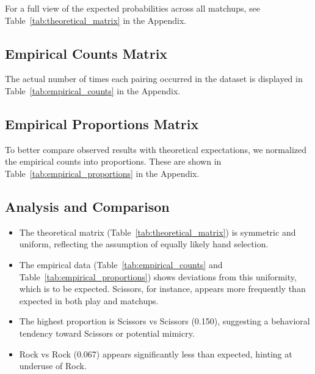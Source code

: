 \documentclass[12pt]{article}
\begin{document}
For a full view of the expected probabilities across all matchups, see Table~\ref{tab:theoretical_matrix} in the Appendix.

\subsection*{Empirical Counts Matrix}
The actual number of times each pairing occurred in the dataset is displayed in Table~\ref{tab:empirical_counts} in the Appendix.

\subsection*{Empirical Proportions Matrix}
To better compare observed results with theoretical expectations, we normalized the empirical counts into proportions. These are shown in Table~\ref{tab:empirical_proportions} in the Appendix.

\subsection*{Analysis and Comparison}
\begin{itemize}
    \item The theoretical matrix (Table~\ref{tab:theoretical_matrix}) is symmetric and uniform, reflecting the assumption of equally likely hand selection.
    \item The empirical data (Table~\ref{tab:empirical_counts} and Table~\ref{tab:empirical_proportions}) shows deviations from this uniformity, which is to be expected. Scissors, for instance, appears more frequently than expected in both play and matchups.
    \item The highest proportion is Scissors vs Scissors (0.150), suggesting a behavioral tendency toward Scissors or potential mimicry.
    \item Rock vs Rock (0.067) appears significantly less than expected, hinting at underuse of Rock.
\end{itemize}
\end{document}
